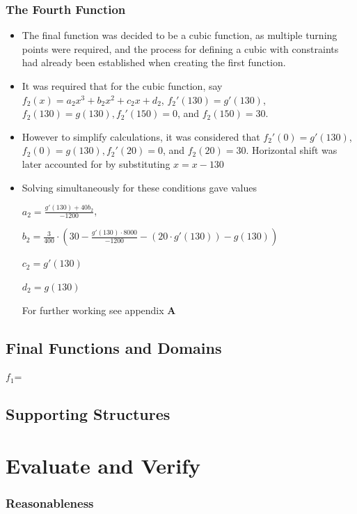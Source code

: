 \documentclass[11pt, letterpaper]{article}
\begin{document}
\subsubsection{The Fourth Function}
\begin{itemize}
	\item The final function was decided to be a cubic function, as multiple turning points were required, and the process for defining a cubic with constraints had already been established when creating the first function. 
	
	\item It was required that for the cubic function, say $f_2(x)=a_2x^3+b_2x^2+c_2x+d_2$, $f_2'(130)=g'(130)$, $f_2(130)=g(130), f_2'(150)=0$, and $f_2(150)=30$. 
	
	\item However to simplify calculations, it was considered that $f_2'(0)=g'(130)$, $f_2(0)=g(130), f_2'(20)=0$, and $f_2(20)=30$. Horizontal shift was later accounted for by substituting $x=x-130$
	
	\item Solving simultaneously for these conditions gave values 
	
	$a_{2}=\frac{g'\left(130\right)+40b_{2}}{-1200}$, 
	
	$b_{2}=\frac{3}{400}\cdot\left(30-\frac{g'\left(130\right)\cdot8000}{-1200}-\left(20\cdot g'\left(130\right)\right)-g\left(130\right)\right)$
	
	$c_{2}=g'\left(130\right)$
	
	$d_{2}=g\left(130\right)$

For further working see appendix $\mathbf{A}$
	
\end{itemize}

\subsection{Final Functions and Domains}

$f_1$=


\subsection{Supporting Structures}



\section{Evaluate and Verify}
\subsubsection{Reasonableness}
\end{document}
